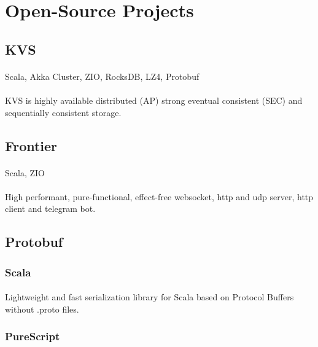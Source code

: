 \section{Open-Source Projects}

\subsection{KVS}
\paragraph{} Scala, Akka Cluster, ZIO, RocksDB, LZ4, Protobuf
\paragraph{}
KVS is highly available distributed (AP) strong eventual consistent (SEC) and sequentially consistent storage.

\subsection{Frontier}
\paragraph{} Scala, ZIO
\paragraph{}
High performant, pure-functional, effect-free websocket, http and udp server, http client and telegram bot.

\subsection{Protobuf}
\subsubsection{Scala}
\paragraph{}
Lightweight and fast serialization library for Scala based on Protocol Buffers without .proto files.

\subsubsection{PureScript}
